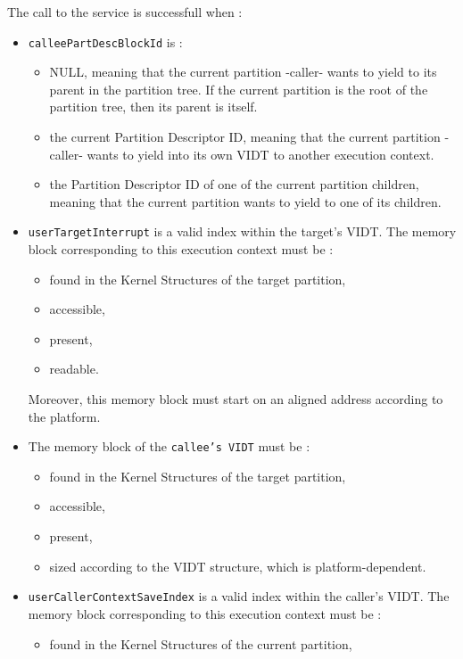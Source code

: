 \documentclass[10pt,a4paper,titlepage]{refart}
\begin{document}
The call to the service is successfull when :
\begin{itemize}
    \item \texttt{calleePartDescBlockId} is :
    \begin{itemize}
        \item NULL, meaning that the current partition -caller- wants to yield to its parent in the partition tree.
        If the current partition is the root of the partition tree, then its parent is itself.
        \item the current Partition Descriptor ID, meaning that the current partition -caller- wants to yield into its own VIDT to another execution context.
        \item the Partition Descriptor ID of one of the current partition children, meaning that the current partition wants to yield to one of its children.
    \end{itemize}
    \item \texttt{userTargetInterrupt} is a valid index within the target's VIDT.
    The memory block corresponding to this execution context must be :
    \begin{itemize}
        \item found in the Kernel Structures of the target partition,
        \item accessible,
        \item present,
        \item readable.
    \end{itemize}
    Moreover, this memory block must start on an aligned address according to the platform.
    \item The memory block of the \texttt{callee's VIDT} must be :
    \begin{itemize}
        \item found in the Kernel Structures of the target partition,
        \item accessible,
        \item present,
        \item sized according to the VIDT structure, which is platform-dependent.
    \end{itemize}
    \item \texttt{userCallerContextSaveIndex} is a valid index within the caller's VIDT.
    The memory block corresponding to this execution context must be :
    \begin{itemize}
        \item found in the Kernel Structures of the current partition,

\end{itemize}
\end{itemize}
\end{document}

